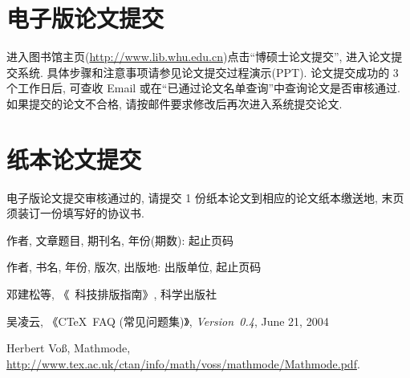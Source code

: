 \documentclass{WHUMaster}   %
\begin{document}
\section*{电子版论文提交}

    进入图书馆主页(\url{http://www.lib.whu.edu.cn})点击``博硕士论文提交'', 进入论文提交系统.
    具体步骤和注意事项请参见论文提交过程演示(PPT).
    论文提交成功的 3 个工作日后, 可查收 Email 或在``已通过论文名单查询''中查询论文是否审核通过.
    如果提交的论文不合格, 请按邮件要求修改后再次进入系统提交论文.


\section*{纸本论文提交}

    电子版论文提交审核通过的, 请提交 1 份纸本论文到相应的论文纸本缴送地,
    末页须装订一份填写好的协议书.





\cleardoublepage{}
{}
\begin{thebibliography}{000}

   作者, 文章题目, 期刊名, 年份(期数): 起止页码

   作者, 书名, 年份, 版次, 出版地: 出版单位, 起止页码

   邓建松等, 《\LaTeXe~科技排版指南》, 科学出版社

   吴凌云, 《CTeX~FAQ (常见问题集)》, \textit{Version~0.4}, June 21, 2004

   Herbert Vo\ss, Mathmode, \url{http://www.tex.ac.uk/ctan/info/math/voss/mathmode/Mathmode.pdf}.

\end{thebibliography}



\backmatter
\cleardoublepage
\end{document}
